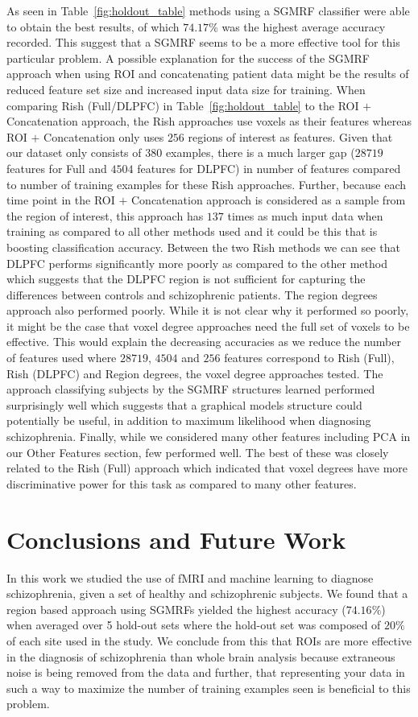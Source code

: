 \documentclass{article} %
\begin{document}
As seen in Table~\ref{fig:holdout_table} methods using a SGMRF classifier were
able to obtain the best results, of which $74.17\%$ was the highest average
accuracy recorded. This suggest that a SGMRF seems to be a more
effective tool for this particular problem. A possible explanation for the
success of the SGMRF approach when using ROI and concatenating patient
data might be the results of reduced feature set size and increased input data
size for training. When comparing Rish (Full/DLPFC) in Table~\ref{fig:holdout_table} 
to the ROI $+$ Concatenation approach, the Rish approaches use voxels as their
features whereas ROI $+$ Concatenation only uses $256$ regions of interest as 
features. Given that our dataset only consists of $380$ examples, there is a 
much larger gap ($28719$ features for Full and $4504$ features for DLPFC) in 
number of features compared to number of training examples for these Rish 
approaches. Further, because each time point in the ROI $+$ Concatenation 
approach is considered as a sample from the region of interest, this approach
has $137$ times as much input data when training as compared to all other
methods used and it could be this that is boosting classification accuracy.
Between the two Rish methods we can see that DLPFC performs significantly
more poorly as compared to the other method which suggests that the
DLPFC region is not sufficient for capturing the differences between controls
and schizophrenic patients. The region degrees approach also performed poorly.
While it is not clear why it performed so poorly, it might be the case that
voxel degree approaches need the full set of voxels to be effective. This would
explain the decreasing accuracies as we reduce the number of features used where
$28719$, $4504$ and $256$ features correspond to Rish (Full), Rish (DLPFC) and 
Region degrees, the voxel degree approaches tested. The approach classifying
subjects by the SGMRF structures learned performed surprisingly well which
suggests that a graphical models structure could potentially be useful, in 
addition to maximum likelihood when diagnosing schizophrenia. Finally, while
we considered many other features including PCA in our Other Features section, few performed
well. The best of these was closely related to the Rish (Full) approach which
indicated that voxel degrees have more discriminative power for this task as
compared to many other features.


\section{Conclusions and Future Work}
In this work we studied the use of fMRI and machine learning to diagnose
schizophrenia, given a set of healthy and schizophrenic subjects. We found
that a region based approach using SGMRFs yielded the highest accuracy 
($74.16\%$) when averaged over 5 hold-out sets where the hold-out set was
composed of $20\%$ of each site used in the study. We conclude from this
that ROIs are more effective in the diagnosis of schizophrenia than whole
brain analysis because extraneous noise is being removed from the data and
further, that representing your data in such a way to maximize the number
of training examples seen is beneficial to this problem.
\end{document}
